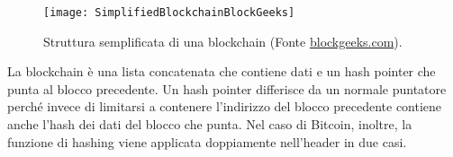 \begin{figure}[h!]
\centering
\texttt{[image: SimplifiedBlockchainBlockGeeks]}
\caption{Struttura semplificata di una blockchain (Fonte \url{blockgeeks.com}).}
\label{fig:simplifiedblockchainblockgeeks}
\end{figure}


La blockchain è una lista concatenata che contiene dati e un hash pointer che punta al blocco precedente. Un hash pointer differisce da un normale puntatore perché invece di limitarsi a contenere l’indirizzo del blocco precedente contiene anche l’hash dei dati del blocco che punta. Nel caso di Bitcoin, inoltre, la funzione di hashing viene applicata doppiamente nell’header in due casi.\\

\begin{table}[ht]
	\centering
\caption{Struttura dell'header di un blocco Bitcoin (documentazione ufficiale \cite{bitcoinofficialdoc}}
\end{table}


